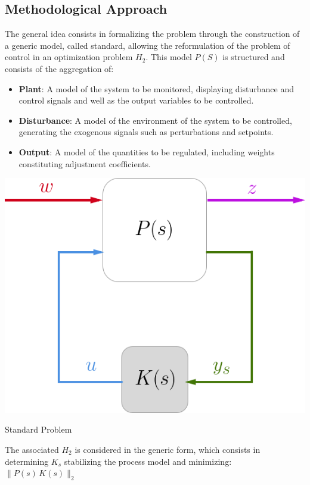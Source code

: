\subsection{Methodological Approach}
The general idea consists in formalizing the problem through the construction of a generic model, called standard, allowing the reformulation of the problem of control in an optimization problem $H_{2}$\cite[-2cm]{Zhou:1996:ROC:225507}. This model $P(S)$ is structured and consists of the aggregation of:
\begin{itemize}
\begin{itemize}
\item \textbf{Plant}: A model of the system to be monitored, displaying disturbance and control signals and well as the output variables to be controlled.
\item \textbf{Disturbance}: A model of the environment of the system to be controlled, generating the exogenous signals such as perturbations and setpoints.
\item \textbf{Output}: A model of the quantities to be regulated, including weights constituting adjustment coefficients.
\end{itemize}
\end{itemize}
\begin{marginfigure}[-4.5cm]
	\includegraphics[width=1.2\linewidth]{figs/03/standard}
	\caption{Standard Problem}
	\label{standard}
\end{marginfigure}

The associated $H_{2}$ is considered in the generic form, which consists in determining $K_{s}$ stabilizing the process model and minimizing: $\lVert P(s)\,K(s) \rVert _{2}$

